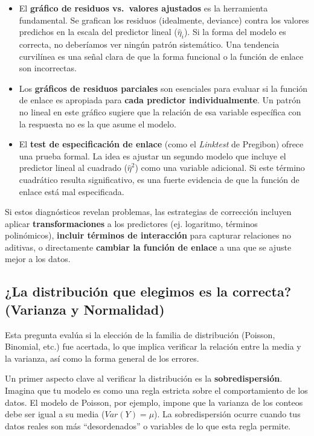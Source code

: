 \documentclass[
  letterpaper,
  DIV=11,
  numbers=noendperiod]{scrreprt}
\begin{document}
\begin{itemize}
\item
  El \textbf{gráfico de residuos vs.~valores ajustados} es la
  herramienta fundamental. Se grafican los residuos (idealmente,
  deviance) contra los valores predichos en la escala del predictor
  lineal (\(\hat{\eta}_i\)). Si la forma del modelo es correcta, no
  deberíamos ver ningún patrón sistemático. Una tendencia curvilínea es
  una señal clara de que la forma funcional o la función de enlace son
  incorrectas.
\item
  Los \textbf{gráficos de residuos parciales} son esenciales para
  evaluar si la función de enlace es apropiada para \textbf{cada
  predictor individualmente}. Un patrón no lineal en este gráfico
  sugiere que la relación de esa variable específica con la respuesta no
  es la que asume el modelo.
\item
  El \textbf{test de especificación de enlace} (como el \emph{Linktest}
  de Pregibon) ofrece una prueba formal. La idea es ajustar un segundo
  modelo que incluye el predictor lineal al cuadrado (\(\hat{\eta}^2\))
  como una variable adicional. Si este término cuadrático resulta
  significativo, es una fuerte evidencia de que la función de enlace
  está mal especificada.
\end{itemize}

Si estos diagnósticos revelan problemas, las estrategias de corrección
incluyen aplicar \textbf{transformaciones} a los predictores (ej.
logaritmo, términos polinómicos), \textbf{incluir términos de
interacción} para capturar relaciones no aditivas, o directamente
\textbf{cambiar la función de enlace} a una que se ajuste mejor a los
datos.

\subsection{¿La distribución que elegimos es la correcta? (Varianza y
Normalidad)}\label{la-distribuciuxf3n-que-elegimos-es-la-correcta-varianza-y-normalidad}

Esta pregunta evalúa si la elección de la familia de distribución
(Poisson, Binomial, etc.) fue acertada, lo que implica verificar la
relación entre la media y la varianza, así como la forma general de los
errores.

Un primer aspecto clave al verificar la distribución es la
\textbf{sobredispersión}. Imagina que tu modelo es como una regla
estricta sobre el comportamiento de los datos. El modelo de Poisson, por
ejemplo, impone que la varianza de los conteos debe ser igual a su media
(\(Var(Y) = \mu\)). La sobredispersión ocurre cuando tus datos reales
son más ``desordenados'' o variables de lo que esta regla permite.
\end{document}
